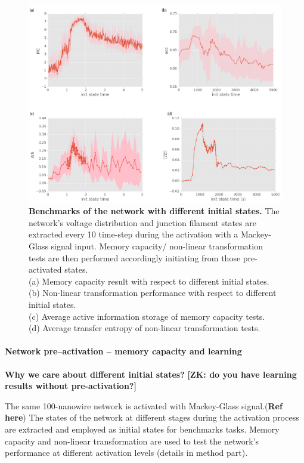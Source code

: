 \documentclass[fleqn,10pt,  amsmath,amssymb,aps]{wlscirep}
\begin{document}
\begin{figure}[]
	\centering
	\includegraphics[width=1\linewidth]{figure/benchmark.png}
	\caption{\textbf{Benchmarks of the network with different initial states.} The network's voltage distribution and junction filament states are extracted every 10 time-step during the activation with a Mackey-Glass signal input. Memory capacity/ non-linear transformation tests are then performed accordingly initiating from those pre-activated states. \\
	(a) Memory capacity result with respect to different initial states.\\
	(b) Non-linear transformation performance with respect to different initial states.\\
	(c) Average active information storage of memory capacity tests.\\
	(d) Average transfer entropy of non-linear transformation tests.} 
	\label{fig:benchmark}
\end{figure}

\paragraph{Network pre--activation -- memory capacity and learning}
\textbf{Why we care about different initial states?} 
\textbf{[ZK: do you have learning results without pre-activation?]}

The same 100-nanowire network is activated with Mackey-Glass signal.(\textbf{Ref here}) The states of the network at different stages during the activation process are extracted and employed as initial states for benchmarks tasks. Memory capacity and non-linear transformation are used to test the network's performance at different activation levels (details in method part). 
\end{document}

